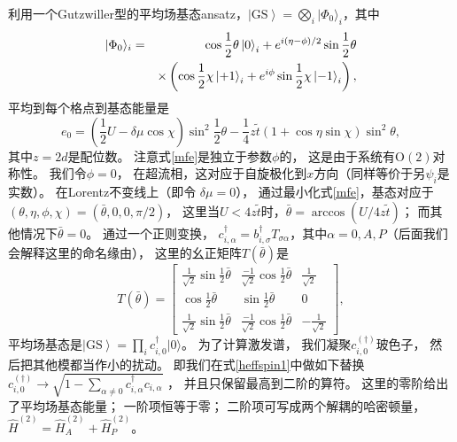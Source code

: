 利用一个Gutzwiller型的平均场基态ansatz，$\left| \text{GS} \right\rangle = \bigotimes_i | \Phi_0 \rangle_i$，其中
\begin{eqnarray}
      | \Phi_0 \rangle_i &=& \cos \frac{1}{2}\theta \ket{0}_i + e^{i (\eta-\phi) / 2} \sin \frac{1}{2}\theta \nonumber\\
      &&  \times \left( \cos \frac{1}{2}\chi \ket{+1}_i + e^{i \phi } \sin \frac{1}{2}\chi \ket{-1}_i   \right),\nonumber
\end{eqnarray}
平均到每个格点到基态能量是
\begin{equation}
  e_0 = \left( \frac{1}{2}U - \delta \mu \cos \chi \right) \sin^2  \frac{1}{2}\theta - \frac{1}{4} z\tilde{t} (1 + \cos \eta \sin  \chi) \sin^2 \theta , \label{mfe}
\end{equation}
其中$z=2d$是配位数。
注意式\eqref{mfe}是独立于参数$\phi$的，
这是由于系统有$\mathrm{O} (2)$对称性。
我们令$\phi=0$，
在超流相，这对应于自旋极化到$x$方向（同样等价于另$\psi_i$是实数）。
在Lorentz不变线上（即令 $\delta \mu = 0$），
通过最小化式\eqref{mfe}，基态对应于$(\theta, \eta, \phi, \chi) = (\bar{\theta}, 0, 0, \pi / 2)$，
这里当$U < 4z \tilde{t}$时，$\bar{\theta} = \arccos (U / 4z \tilde{t})$；
而其他情况下$\bar{\theta} = 0$。
通过一个正则变换，
$c_{i, \alpha}^{ \dagger} = b_{i, \sigma}^{ \dagger} T_{\sigma \alpha}$，其中$\alpha = 0, A, P$（后面我们会解释这里的命名缘由），
这里的幺正矩阵$T(\bar\theta)$是
\begin{equation}
   T(\bar\theta) = \begin{bmatrix}
           \frac{1}{\sqrt{2}} \sin \frac{1}{2}\bar{\theta} & \frac{- 1}{\sqrt{2}}     \cos \frac{1}{2}\bar{\theta} & \frac{1}{\sqrt{2}}\\
     \cos \frac{1}{2}\bar{\theta} & \sin \frac{1}{2}\bar{\theta} & 0\\
     \frac{1}{\sqrt{2}} \sin \frac{1}{2}\bar{\theta} & \frac{- 1}{\sqrt{2}}     \cos \frac{1}{2}\bar{\theta} & - \frac{1}{\sqrt{2}}
  \end{bmatrix},\nonumber
\end{equation}
平均场基态是$\left| \text{GS} \right\rangle = \prod_i c_{i,0}^{ \dagger} |0 \rangle$。
为了计算激发谱，
我们凝聚$c_{i,0}^{(\dagger)}$玻色子，
然后把其他模都当作小的扰动。
即我们在式\eqref{heffspin1}中做如下替换$c_{i, 0}^{( \dagger)} \rightarrow \sqrt{1 - \sum_{\alpha \neq 0} c_{i, \alpha}^{ \dagger} c_{i, \alpha}}$ \cite{Auerbach1994}，
并且只保留最高到二阶的算符。
这里的零阶给出了平均场基态能量；
一阶项恒等于零；
二阶项可写成两个解耦的哈密顿量，
$\hat{H}^{(2)} = \hat{H}_{A}^{(2)} + \hat{H}_{P}^{(2)}$。
